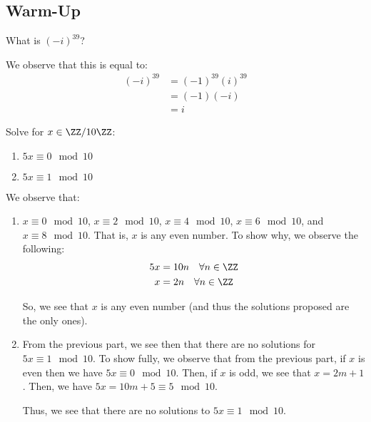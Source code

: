 \documentclass[openany]{book}
\begin{document}
\subsection{Warm-Up}
\begin{hw}
	What is $(-i)^{39}$?
\end{hw}
\begin{solution}
	We observe that this is equal to:
	\begin{align*}
		(-i)^{39} &= (-1)^{39}(i)^{39} \\
		&= (-1)(-i) \\
		&= i
	\end{align*}
\end{solution}

\begin{hw}
	Solve for $x \in \ZZ/10\ZZ$:
	\begin{enumerate}
		\item $5x \equiv 0 \mod 10$
		\item $5x \equiv 1 \mod 10$
	\end{enumerate}
\end{hw}
\begin{solution}
	We observe that:
	\begin{enumerate}
		\item $x \equiv 0 \mod 10$, $x \equiv 2 \mod 10$, $x \equiv 4 \mod 10$, $x \equiv 6 \mod 10$, and $x \equiv 8 \mod 10$. That is, $x$ is any even number. To show why, we observe the following:
		\begin{align*}
			5x &= 10n \quad \forall n \in \ZZ \\
			x &= 2n \quad \forall n \in \ZZ
		\end{align*}
	
		So, we see that $x$ is any even number (and thus the solutions proposed are the only ones).
		
		\item From the previous part, we see then that there are no solutions for $5x \equiv 1 \mod 10$. To show fully, we observe that from the previous part, if $x$ is even then we have $5x \equiv 0 \mod 10$. Then, if $x$ is odd, we see that $x = 2m + 1$. Then, we have $5x = 10m + 5 \equiv 5 \mod 10$.
		
		Thus, we see that there are no solutions to $5x \equiv 1 \mod 10$.
	\end{enumerate}
\end{solution}
\end{document}
